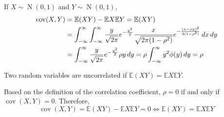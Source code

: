 \documentclass{huhtakm-template-book}
\newcommand{\expect}{\mathbb{E}}
\DeclareMathOperator{\N}{N}
\DeclareMathOperator{\cov}{cov}
\begin{document}
\begin{eg}
	If $X\sim\N(0,1)$ and $Y\sim\N(0,1)$,
	\begin{align*}
		\cov(X,Y)&=\expect(XY)-\expect X\expect Y=\expect(XY)\\
		&=\intinfty\intinfty\frac{y}{\sqrt{2\pi}}e^{-\frac{y^{2}}{2}}\frac{x}{\sqrt{2\pi(1-\rho^{2})}}e^{-\frac{(x-\rho y)^{2}}{2(1-\rho^{2})}}\,dx\,dy\\
		&=\intinfty\frac{y}{\sqrt{2\pi}}e^{-\frac{y^{2}}{2}}\rho y\,dy=\rho\intinfty y^{2}\phi(y)\,dy=\rho
	\end{align*}
\end{eg}
\begin{lem}
	Two random variables are uncorrelated if $\expect(XY)=\expect{X}\expect{Y}$.
\end{lem}
\begin{proofing}
	Based on the definition of the correlation coefficient, $\rho=0$ if and only if $\cov(X,Y)=0$. Therefore,
	\begin{equation*}
		\cov(X,Y)=\expect(XY)-\expect{X}\expect{Y}=0\iff \expect(XY)=\expect{X}\expect{Y}
	\end{equation*}
\end{proofing}
\end{document}
